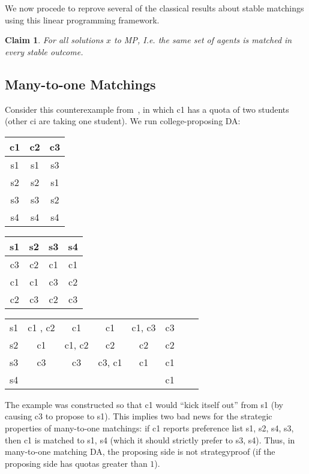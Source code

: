 \documentclass[12pt]{article}
\newtheorem{claim}[definition]{Claim}
\begin{document}
  We now procede to reprove several of the classical results about stable
  matchings using this linear programming framework.

  \begin{claim}
    For all solutions $x$ to MP, 
    I.e. the same set of agents is matched in every stable outcome.
  \end{claim}



  \subsection{Many-to-one Matchings}
    Consider this counterexample from~\cite{RothCollegeSubtlety85},
    in which c1 has a quota of two students (other ci are taking one student).
    We run college-proposing DA:

    \begin{tabular}{ccc}
      c1 & c2 & c3 \\ \hline
      s1 & s1 & s3 \\
      s2 & s2 & s1 \\
      s3 & s3 & s2 \\
      s4 & s4 & s4 \\
    \end{tabular}
    \quad
    \begin{tabular}{cccc}
      s1 & s2 & s3 & s4 \\ \hline
      c3 & c2 & c1 & c1 \\
      c1 & c1 & c3 & c2 \\
      c2 & c3 & c2 & c3 \\
    \end{tabular}
    \qquad
    \begin{tabular}{c||c|c|c|c|c|c|c}
         s1 & c1 , c2 & c1  &   c1  & c1, c3 & c3
      \\ s2 & c1      & c1, c2 & c2 & c2 & c2
      \\ s3 & c3      & c3  & c3, c1& c1  & c1
      \\ s4 &       & & & & c1
    \end{tabular}

    The example was constructed so that c1 would ``kick itself out'' from
    s1 (by causing c3 to propose to s1). This implies two bad news
    for the strategic properties of many-to-one matchings:
    if c1 reports preference list s1, s2, s4, s3, then c1 is matched to
    s1, s4 (which it should strictly prefer to s3, s4).
    Thus, in many-to-one matching DA, the proposing side is not strategyproof
    (if the proposing side has quotas greater than $1$).
\end{document}
